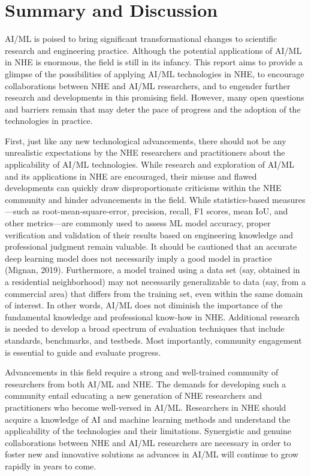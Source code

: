 \section{Summary and Discussion}
\label{sec:ai_summary}

AI/ML is poised to bring significant transformational changes to scientific research and engineering practice. Although the potential applications of AI/ML in NHE is enormous, the field is still in its infancy. This report aims to provide a glimpse of the possibilities of applying AI/ML technologies in NHE, to encourage collaborations between NHE and AI/ML researchers, and to engender further research and developments in this promising field. However, many open questions and barriers remain that may deter the pace of progress and the adoption of the technologies in practice. 

First, just like any new technological advancements, there should not be any unrealistic expectations by the NHE researchers and practitioners about the applicability of AI/ML technologies. While research and exploration of AI/ML and its applications in NHE are encouraged, their misuse and flawed developments can quickly draw disproportionate criticisms within the NHE community and hinder advancements in the field. While statistics-based measures—such as root-mean-square-error, precision, recall, F1 scores, mean IoU, and other metrics—are commonly used to assess ML model accuracy, proper verification and validation of their results based on engineering knowledge and professional judgment remain valuable. It should be cautioned that an accurate deep learning model does not necessarily imply a good model in practice (Mignan, 2019). Furthermore, a model trained using a data set (say, obtained in a residential neighborhood) may not necessarily generalizable to data (say, from a commercial area) that differs from the training set, even within the same domain of interest. In other words, AI/ML does not diminish the importance of the fundamental knowledge and professional know-how in NHE. Additional research is needed to develop a broad spectrum of evaluation techniques that include standards, benchmarks, and testbeds. Most importantly, community engagement is essential to guide and evaluate progress. 

Advancements in this field require a strong and well-trained community of researchers from both AI/ML and NHE. The demands for developing such a community entail educating a new generation of NHE researchers and practitioners who become well-versed in AI/ML. Researchers in NHE should acquire a knowledge of AI and machine learning methods and understand the applicability of the technologies and their limitations. Synergistic and genuine collaborations between NHE and AI/ML researchers are necessary in order to foster new and innovative solutions as advances in AI/ML will continue to grow rapidly in years to come. 

